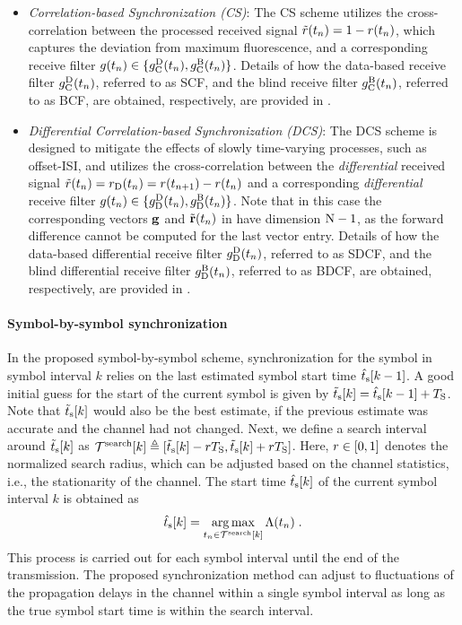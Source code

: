 \begin{itemize}
    \item \textit{Correlation-based Synchronization (CS)}: The \ac{CS} scheme utilizes the cross-correlation between the processed received signal $\Tilde{r}(t_n) = 1 - r(t_n)$, which captures the deviation from maximum fluorescence, and a corresponding receive filter $g(t_n) \in \{g^{\mathrm{D}}_{\mathrm{C}}(t_n), g^{\mathrm{B}}_{\mathrm{C}}(t_n)\}$. Details of how the data-based receive filter $g^{\mathrm{D}}_{\mathrm{C}}(t_n)$, referred to as \ac{SCF}, and the blind receive filter $g^{\mathrm{B}}_{\mathrm{C}}(t_n)$, referred to as \ac{BCF}, are obtained, respectively, are provided in .
    \item \textit{Differential Correlation-based Synchronization (DCS)}: The \ac{DCS} scheme is designed to mitigate the effects of slowly time-varying processes, such as offset-\ac{ISI}, and utilizes the cross-correlation between the \textit{differential} received signal $\Tilde{r}(t_n) = r_{\mathrm{D}}(t_n) = r(t_{n+1}) - r(t_n)$ and a corresponding \textit{differential} receive filter $g(t_n) \in \{g^{\mathrm{D}}_{\mathrm{D}}(t_n), g^{\mathrm{B}}_{\mathrm{D}}(t_n)\}$. Note that in this case the corresponding vectors $\mathbf{g}$ and $\Tilde{\mathbf{r}} (t_n)$ in  have dimension $\mathrm{N}-1$, as the forward difference cannot be computed for the last vector entry. Details of how the data-based differential receive filter $g^{\mathrm{D}}_{\mathrm{D}}(t_n)$, referred to as \ac{SDCF}, and the blind differential receive filter $g^{\mathrm{B}}_{\mathrm{D}}(t_n)$, referred to as \ac{BDCF}, are obtained, respectively, are provided in .
  \end{itemize}
%
\paragraph{Symbol-by-symbol synchronization}
In the proposed symbol-by-symbol scheme, synchronization for the symbol in symbol interval $k$ relies on the last estimated symbol start time $\hat{t}_\mathrm{s}[k-1]$. A good initial guess for the start of the current symbol is given by $\Tilde{t}_\mathrm{s}[k] = \hat{t}_\mathrm{s}[k-1] + T_{\mathrm{S}}$. Note that $\Tilde{t}_\mathrm{s}[k]$ would also be the best estimate, if the previous estimate was accurate and the channel had not changed. Next, we define a search interval around $\Tilde{t}_\mathrm{s}[k]$ as $\mathcal{T}^{\mathrm{search}}[k] \triangleq [\Tilde{t}_\mathrm{s}[k] - r T_{\mathrm{S}}, \Tilde{t}_\mathrm{s}[k] + r T_{\mathrm{S}}]$. Here, $r \in [0,1]$ denotes the normalized search radius, which can be adjusted based on the channel statistics, i.e., the stationarity of the channel.
The start time $\hat{t}_\mathrm{s}[k]$ of the current symbol interval $k$ is obtained as
\begin{equation}
  \hat{t}_\mathrm{s}[k] = \operatorname*{\mathrm{arg\,max}}_{t_n \in \mathcal{T}^{\mathrm{search}}[k]} \Lambda(t_n)\;.
  \label{eq:estimation_symbol_start}
\end{equation}
This process is carried out for each symbol interval until the end of the transmission. The proposed synchronization method can adjust to fluctuations of the propagation delays in the channel within a single symbol interval as long as the true symbol start time is within the search interval.
%
